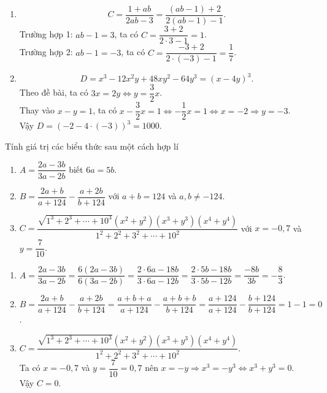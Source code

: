 \begin{bt}
{\begin{enumerate}
			\item $$C= \dfrac{1+ab}{2ab-3}= \dfrac{(ab-1)+2}{2(ab-1)-1}.$$
			Trường hợp 1: $ab-1=3$, ta có $C= \dfrac{3+2}{2 \cdot 3 -1}= 1$.\\
			Trường hợp 2: $ab-1=-3$, ta có $C= \dfrac{-3+2}{2 \cdot (-3) -1}= \dfrac{1}{7}$.
			
			\item $$D= x^{3} -12x^{2}y +48xy^{2}-64y^{3}= (x-4y)^{3}.$$
			Theo đề bài, ta có $3x=2y \Leftrightarrow y= \dfrac{3}{2}x$.\\
			Thay vào $x-y=1$, ta có $x- \dfrac{3}{2}x=1 \Leftrightarrow - \dfrac{1}{2}x=1 \Leftrightarrow x=-2 \Rightarrow y=-3$.\\
			Vậy $D= \left( -2-4 \cdot (-3) \right)^{3}= 1000 $.
			
		\end{enumerate}
		
	}
\end{bt}



\begin{bt}%
	
	Tính giá trị các biểu thức sau một cách hợp lí
	\begin{enumerate}
		\item $A= \dfrac{2a-3b}{3a-2b}$ biết $6a=5b$.
		\item $B= \dfrac{2a+b}{a+124}- \dfrac{a+2b}{b+124}$ với $a+b=124$ và $a, b \neq -124$.
		\item $C= \dfrac{\sqrt{1^{3}+2^{3}+ \cdots + 10^{3}}(x^{2}+y^{2})(x^{3}+y^{3})(x^{4}+y^{4})}{1^{2}+2^{2}+ 3^{2}+ \cdots+ 10^{2}}$ với $x=-0,7$ và $y= \dfrac{7}{10}$.
	\end{enumerate}
	\loigiai
	{
		\begin{enumerate}
			\item $A= \dfrac{2a-3b}{3a-2b}= \dfrac{6(2a-3b)}{6(3a-2b)}= \dfrac{2 \cdot 6a-18b}{3 \cdot 6a -12b}= \dfrac{2 \cdot 5b-18b}{3 \cdot 5b-12b}= \dfrac{-8b}{3b}= -\dfrac{8}{3}$.
			
			\item $B= \dfrac{2a+b}{a+124}- \dfrac{a+2b}{b+124}= \dfrac{a+b+a}{a+124}- \dfrac{a+b+b}{b+124}= \dfrac{a+124}{a+124}- \dfrac{b+124}{b+124}=1-1=0$.
			
			\item  $C= \dfrac{\sqrt{1^{3}+2^{3}+ \cdots + 10^{3}}(x^{2}+y^{2})(x^{3}+y^{3})(x^{4}+y^{4})}{1^{2}+2^{2}+ 3^{2}+ \cdots+ 10^{2}}$.\\
			Ta có $x= -0{,}7$ và $y=\dfrac{7}{10}=0{,}7$ nên $x=-y \Rightarrow x^{3}=-y^{3} \Leftrightarrow x^{3}+y^{3}=0$. \\
			Vậy $C=0$.
		\end{enumerate}
	}
\end{bt}

